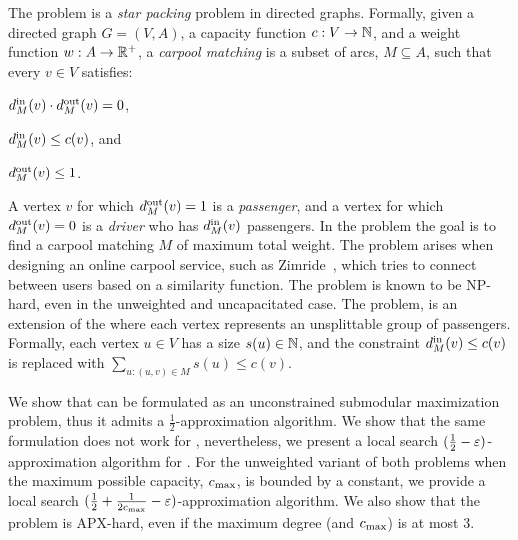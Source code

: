 
The \carpool problem is a \emph{star packing} problem in directed
graphs.  Formally, given a directed graph $G = (V, A)$, a capacity
function $c: V \rightarrow \N$, and a weight function $w:
A \rightarrow \R^+$, a \emph{carpool matching} is a subset of arcs,
$M \subseteq A$, such that every $v \in V$ satisfies:%
\begin{inparaenum}[(i)]
\item $\din[M](v) \cdot \dout[M](v) = 0$,
\item $\din[M](v) \leq c(v)$, and 
\item $\dout[M](v) \leq 1$.
\end{inparaenum}
A vertex $v$ for which $\dout[M](v) = 1$ is a \emph{passenger}, and a
vertex for which $\dout[M](v) = 0$ is a \emph{driver} who has
$\din[M](v)$ passengers.  In the \carpool problem the goal is to find
a carpool matching $M$ of maximum total weight.
%
The problem arises when designing an online carpool service, such as
Zimride~\cite{zimride}, which tries to connect between users based on
a similarity function.  The problem is known to be NP-hard, even in
the unweighted and uncapacitated case.
%
The \gcp problem, is an extension of the \carpool where each vertex
represents an unsplittable group of passengers.  Formally, each vertex
$u \in V$ has a size $s(u) \in \N$, and the constraint $\din(v) \leq
c(v)$ is replaced with $\sum_{u:(u,v) \in M} s(u) \leq c(v)$.

We show that \carpool can be formulated as an unconstrained submodular
maximization problem, thus it admits a $\frac{1}{2}$-approximation
algorithm.  We show that the same formulation does not work for \gcp,
nevertheless, we present a local search $(\frac{1}{2}
- \eps)$-approximation algorithm for \gcp.
%
For the unweighted variant of both problems when the maximum possible
capacity, $\cmax$, is bounded by a constant, we provide a local search
$(\half + \inv{2\cmax} - \eps)$-approximation algorithm.  We also show
that the problem is APX-hard, even if the maximum degree (and $\cmax$) is
at most $3$.

